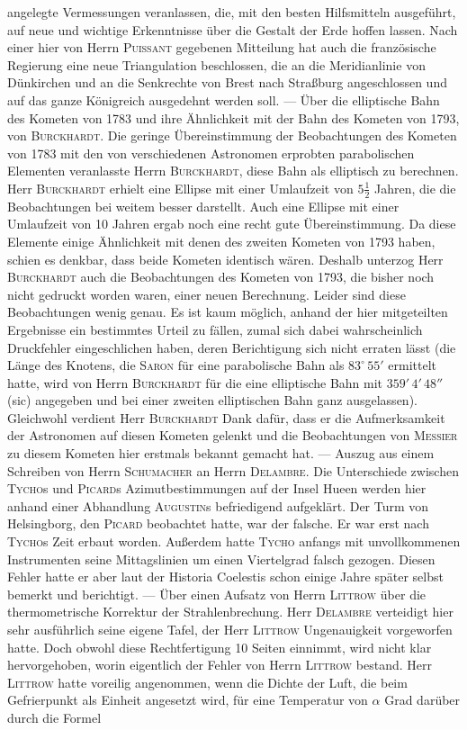 angelegte Vermessungen veranlassen, die, mit den besten Hilfsmitteln ausgeführt, auf neue und wichtige Erkenntnisse über die Gestalt der Erde hoffen lassen. Nach einer hier von Herrn \textsc{Puissant} gegebenen Mitteilung hat auch die französische Regierung eine neue Triangulation beschlossen, die an die Meridianlinie von Dünkirchen und an die Senkrechte von Brest nach Straßburg angeschlossen und auf das ganze Königreich ausgedehnt werden soll. --- Über die elliptische Bahn des Kometen von 1783 und ihre Ähnlichkeit mit der Bahn des Kometen von 1793, von \textsc{Burckhardt}. Die geringe Übereinstimmung der Beobachtungen des Kometen von 1783 mit den von verschiedenen Astronomen erprobten parabolischen Elementen veranlasste Herrn \textsc{Burckhardt}, diese Bahn als elliptisch zu berechnen. Herr \textsc{Burckhardt} erhielt eine Ellipse mit einer Umlaufzeit von $5\tfrac{1}{2}$ Jahren, die die Beobachtungen bei weitem besser darstellt. Auch eine Ellipse mit einer Umlaufzeit von 10 Jahren ergab noch eine recht gute Übereinstimmung. Da diese Elemente einige Ähnlichkeit mit denen des zweiten Kometen von 1793 haben, schien es denkbar, dass beide Kometen identisch wären. Deshalb unterzog Herr \textsc{Burckhardt} auch die Beobachtungen des Kometen von 1793, die bisher noch nicht gedruckt worden waren, einer neuen Berechnung. Leider sind diese Beobachtungen wenig genau. Es ist kaum möglich, anhand der hier mitgeteilten Ergebnisse ein bestimmtes Urteil zu fällen, zumal sich dabei wahrscheinlich Druckfehler eingeschlichen haben, deren Berichtigung sich nicht erraten lässt (die Länge des Knotens, die \textsc{Saron} für eine parabolische Bahn als $83^\circ\,55'$ ermittelt hatte, wird von Herrn \textsc{Burckhardt} für die eine elliptische Bahn mit $359'\,4'\,48''$ (sic) angegeben und bei einer zweiten elliptischen Bahn ganz ausgelassen). Gleichwohl verdient Herr \textsc{Burckhardt} Dank dafür, dass er die Aufmerksamkeit der Astronomen auf diesen Kometen gelenkt und die Beobachtungen von \textsc{Messier} zu diesem Kometen hier erstmals bekannt gemacht hat. --- Auszug aus einem Schreiben von Herrn \textsc{Schumacher} an Herrn \textsc{Delambre}. Die Unterschiede zwischen \textsc{Tycho}s und \textsc{Picard}s Azimutbestimmungen auf der Insel Hueen werden hier anhand einer Abhandlung \textsc{Augustin}s befriedigend aufgeklärt. Der Turm von Helsingborg, den \textsc{Picard} beobachtet hatte, war der falsche. Er war erst nach \textsc{Tycho}s Zeit erbaut worden. Außerdem hatte \textsc{Tycho} anfangs mit unvollkommenen Instrumenten seine Mittagslinien um einen Viertelgrad falsch gezogen. Diesen Fehler hatte er aber laut der Historia Coelestis schon einige Jahre später selbst bemerkt und berichtigt. --- Über einen Aufsatz von Herrn \textsc{Littrow} über die thermometrische Korrektur der Strahlenbrechung. Herr \textsc{Delambre} verteidigt hier sehr ausführlich seine eigene Tafel, der Herr \textsc{Littrow} Ungenauigkeit vorgeworfen hatte. Doch obwohl diese Rechtfertigung 10 Seiten einnimmt, wird nicht klar hervorgehoben, worin eigentlich der Fehler von Herrn \textsc{Littrow} bestand. Herr \textsc{Littrow} hatte voreilig angenommen, wenn die Dichte der Luft, die beim Gefrierpunkt als Einheit angesetzt wird, für eine Temperatur von $\alpha$ Grad darüber durch die Formel
